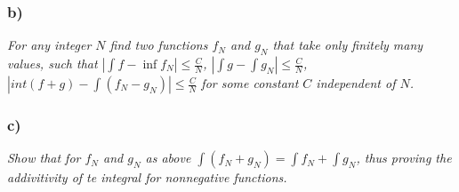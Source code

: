 \documentclass[12pt]{article}
\theoremstyle{plain}
\begin{document}

\subsubsection*{ b)}
\textit{For any integer $N$ find two functions $f_N$ and $g_N$ that take only finitely many values, such that $|\int f - \inf f_N| \leq \frac{C}{N}$, $|\int g - \int g_N| \leq \frac{C}{N}$, $|int(f + g) - \int(f_N - g_N)| \leq \frac{C}{N}$ for some constant $C$ independent of $N$.}

\subsubsection*{ c)}
\textit{Show that for $f_N$ and $g_N$ as above $\int(f_N + g_N) = \int f_N + \int g_N$, thus proving the addivitivity of te integral for nonnegative functions.}
\end{document}
